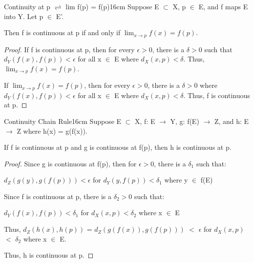     \begin{wtheorem}{Continuity at p $\rightleftharpoons$ lim f(p) = f(p)}{16cm}
        Suppose E $\subset$ X, p $\in$ E, and
        f maps E into Y. Let p $\in$ E'.

        Then f is continuous at p if and only if
        $\lim_{x \rightarrow p} f(x) = f(p)$.
    \end{wtheorem}

    \begin{proof}
        If f is continuous at p, then for every $\epsilon > 0$, there
        is a $\delta > 0$ such that $d_Y(f(x),f(p)) < \epsilon$
        for all x $\in$ E where $d_X(x,p) < \delta$.
        Thus, $\lim_{x \rightarrow p} f(x) = f(p)$.

        \vspace{0.2cm}

        If $\lim_{x \rightarrow p} f(x) = f(p)$, then for every
        $\epsilon > 0$, there is a $\delta > 0$ where $d_Y(f(x),f(p)) < \epsilon$
        for all x $\in$ E where $d_X(x,p) < \delta$.
        Thus, f is continuous at p.
    \end{proof}

    \vspace{0.5cm}



    \begin{wtheorem}{Continuity Chain Rule}{16cm}
        Suppose E $\subset$ X, f: E $\rightarrow$ Y, g: f(E) $\rightarrow$ Z,
        and h: E $\rightarrow$ Z where h(x) = g(f(x)).

        If f is continuous at p and g is continuous at f(p),
        then h is continuous at p.
    \end{wtheorem}

    \begin{proof}
        Since g is continuous at f(p), then for $\epsilon > 0$, there is a
        $\delta_1$ such that:

        \hspace{1cm}
        $d_Z(g(y),g(f(p))) < \epsilon$ for $d_Y(y,f(p)) < \delta_1$
        where y $\in$ f(E)

        Since f is continuous at p, there is a $\delta_2 > 0$ such that:

        \hspace{1cm}
        $d_Y(f(x),f(p)) < \delta_1$ for $d_X(x,p) < \delta_2$ 
        where x $\in$ E

        Thus, $d_Z(h(x),h(p))$ = $d_Z(g(f(x)),g(f(p)))$ $<$ $\epsilon$
        for $d_X(x,p)$ $<$ $\delta_2$ where x $\in$ E.

        Thus, h is continuous at p.
    \end{proof}



